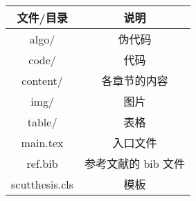 \begin{tabular}{@{}cc@{}}
\toprule
文件/目录      & 说明           \\ \midrule
algo/          & 伪代码          \\
code/          & 代码           \\
content/       & 各章节的内容       \\
img/           & 图片           \\
table/         & 表格           \\
main.tex       & 入口文件         \\
ref.bib        & 参考文献的 bib 文件 \\
scutthesis.cls & 模板           \\ \bottomrule
\end{tabular}
